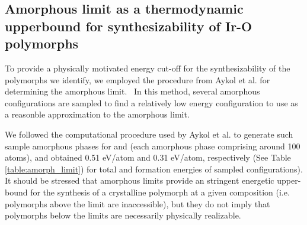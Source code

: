 \subsection{Amorphous limit as a thermodynamic upperbound for synthesizability of Ir-O polymorphs}
%

%
%
To provide a physically motivated energy cut-off for the synthesizability of the polymorphs we identify, we employed the procedure from Aykol et al. for determining the amorphous limit.~\cite{Aykol2018}
%
In this method, several amorphous configurations are sampled to find a relatively low energy configuration to use as a reasonble approximation to the amorphous limit.
%
\begin{table}
\centering
\caption{\label{table:amorph_limit}
%
Density functional theory computed energetics of sampled amorphous phases for \IrOtwo and \IrOthree as per the procedure of Aykol ~\cite{Aykol2018}.
%
Here we report the raw DFT electronic energy per atom ($E_{DFT}$),
the enthalpy of formation (\DHf),
and the energy above the hull relative to the most stable polymorph of each stoichiometry (\rIrOtwo and \aIrOthree).
%
The most stable amorphous phase for each stoichiometry is bolded.
}

\end{table}
We followed the computational procedure used by Aykol et al. to generate such sample amorphous phases for \IrOtwo and \IrOthree
(each amorphous phase comprising around 100 atoms),
and obtained 0.51 eV/atom and 0.31 eV/atom, respectively
(See Table \ref{table:amorph_limit}) for total and formation energies of sampled configurations).
%
It should be stressed that amorphous limits provide an stringent energetic upper-bound for the synthesis of a crystalline polymorph at a given composition (i.e. polymorphs above the limit are inaccessible),
but they do not imply that polymorphs below the limits are necessarily physically realizable.

